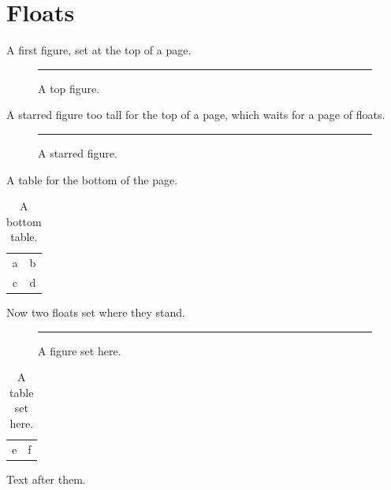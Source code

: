 \documentclass{article}
\begin{document}
\listoffigures
\listoftables
\section{Floats}
A first figure, set at the top of a page.
\begin{figure}[t]\centering\rule{4cm}{2cm}\caption{A top figure.}\end{figure}
A starred figure too tall for the top of a page, which waits for a page of floats.
\begin{figure}\centering\rule{4cm}{.75\textheight}\caption{A starred figure.}\end{figure}
A table for the bottom of the page.
\begin{table}[b]\centering\begin{tabular}{cc}a & b\\ c & d\end{tabular}\caption{A bottom table.}\end{table}
Now two floats set where they stand.
\begin{figure}[H]\centering\rule{4cm}{1cm}\caption{A figure set here.}\end{figure}
\begin{table}[H]\centering\begin{tabular}{cc}e & f\end{tabular}\caption{A table set here.}\end{table}
Text after them.
\end{document}
